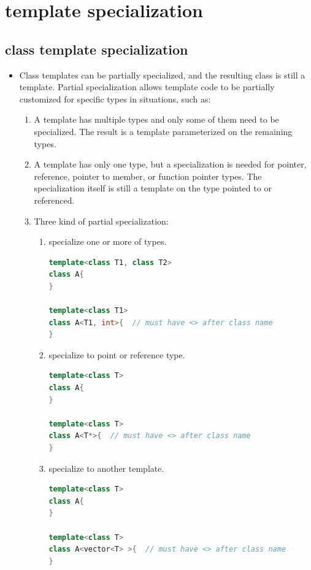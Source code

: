 \documentclass[a4paper,11pt,twoside]{book}
\begin{document}
\section{template specialization}
\subsection{class template specialization}
\begin{itemize}
	\item Class templates can be partially specialized, and the resulting class is still a template. Partial specialization allows template code to be partially customized for specific types in situations, such as:

	\begin{enumerate}
		\item A template has multiple types and only some of them need to be specialized. The result is a template parameterized on the remaining types.

		\item A template has only one type, but a specialization is needed for pointer, reference, pointer to member, or function pointer types. The specialization itself is still a template on the type pointed to or referenced.
		
		\item Three kind of partial specialization:
		\begin{enumerate}
			\item specialize one or more of types.
\begin{lstlisting}[frame=single, language=c++]
template<class T1, class T2>
class A{
}

template<class T1>
class A<T1, int>{  // must have <> after class name
}		
\end{lstlisting}				
			
			\item specialize to point or reference type.
\begin{lstlisting}[frame=single, language=c++]
template<class T>
class A{
}

template<class T>
class A<T*>{  // must have <> after class name
}		
\end{lstlisting}	
			\item specialize to another template.
\begin{lstlisting}[frame=single, language=c++]
template<class T>
class A{
}

template<class T>
class A<vector<T> >{  // must have <> after class name
}			
\end{lstlisting}	


\end{enumerate}
\end{enumerate}
\end{itemize}
\end{document}
